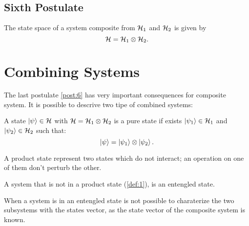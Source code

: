         \subsection{Sixth Postulate}
        \begin{postulate}
            The state space of a system composite from $\mathcal{H}_1$ and $\mathcal{H}_2$ is given by
            \begin{equation*}
                \mathcal{H}=\mathcal{H}_1\otimes\mathcal{H}_2.
            \end{equation*}
            \label{post:6}
        \end{postulate}

    \section{Combining Systems}
    The last postulate \ref{post:6} has very important consequences for composite system. It is possible
    to descrive two tipe of combined systems:

        \begin{definition}
            A state $\ket{\psi}\in\mathcal{H}$ with $\mathcal{H}=\mathcal{H}_1\otimes\mathcal{H}_2$ is a
            pure state if exists $\ket{\psi_1}\in\mathcal{H}_1$ and $\ket{\psi_2}\in\mathcal{H}_2$
            such that:
            \begin{equation*}
                \ket{\psi}=\ket{\psi_1}\otimes\ket{\psi_2}.
            \end{equation*}
            \label{def:1}
        \end{definition}
        A product state represent two states which do not interact; an operation on one of 
        them don't perturb the other.

        \begin{definition}
            A system that is not in a product state (\ref{def:1}), is an entengled state. 
            \label{def:2}
        \end{definition}
        When a system is in an entengled state is not possible to charaterize the two subsystems
        with the states vector, as the state vector of the composite system is known.

